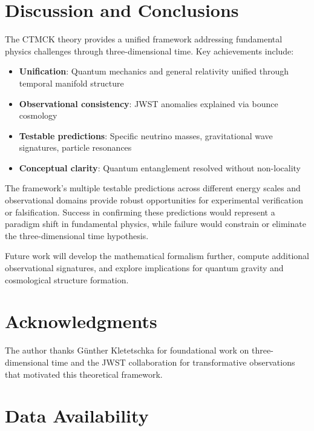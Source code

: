 \documentclass[reprint,amsmath,amssymb,aps,prd,nofootinbib]{revtex4-2}
\begin{document}
\section{Discussion and Conclusions}\label{sec:conclusions}

The CTMCK theory provides a unified framework addressing fundamental physics challenges through three-dimensional time. Key achievements include:

\begin{itemize}
\item \textbf{Unification}: Quantum mechanics and general relativity unified through temporal manifold structure
\item \textbf{Observational consistency}: JWST anomalies explained via bounce cosmology
\item \textbf{Testable predictions}: Specific neutrino masses, gravitational wave signatures, particle resonances
\item \textbf{Conceptual clarity}: Quantum entanglement resolved without non-locality
\end{itemize}

The framework's multiple testable predictions across different energy scales and observational domains provide robust opportunities for experimental verification or falsification. Success in confirming these predictions would represent a paradigm shift in fundamental physics, while failure would constrain or eliminate the three-dimensional time hypothesis.

Future work will develop the mathematical formalism further, compute additional observational signatures, and explore implications for quantum gravity and cosmological structure formation.

\section*{Acknowledgments}

The author thanks Günther Kletetschka for foundational work on three-dimensional time and the JWST collaboration for transformative observations that motivated this theoretical framework.

\section*{Data Availability}
\end{document}
